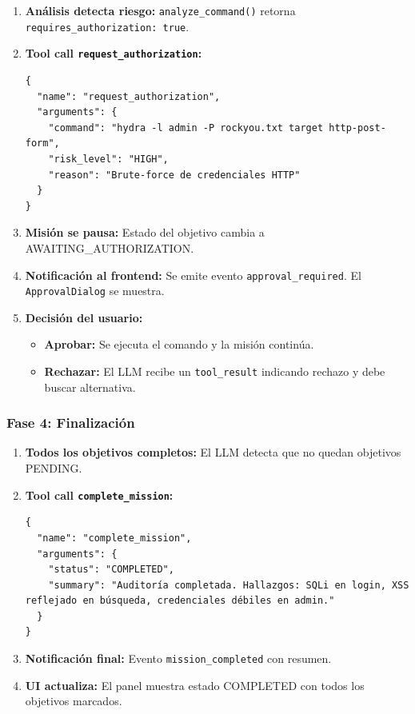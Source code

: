 \begin{enumerate}
    \item \textbf{Análisis detecta riesgo:} \texttt{analyze\_command()} retorna \texttt{requires\_authorization: true}.
    
    \item \textbf{Tool call \texttt{request\_authorization}:}
    \begin{verbatim}
{
  "name": "request_authorization",
  "arguments": {
    "command": "hydra -l admin -P rockyou.txt target http-post-form",
    "risk_level": "HIGH",
    "reason": "Brute-force de credenciales HTTP"
  }
}
    \end{verbatim}
    
    \item \textbf{Misión se pausa:} Estado del objetivo cambia a AWAITING\_AUTHORIZATION.
    
    \item \textbf{Notificación al frontend:} Se emite evento \texttt{approval\_required}. El \texttt{ApprovalDialog} se muestra.
    
    \item \textbf{Decisión del usuario:}
    \begin{itemize}
        \item \textbf{Aprobar:} Se ejecuta el comando y la misión continúa.
        \item \textbf{Rechazar:} El LLM recibe un \texttt{tool\_result} indicando rechazo y debe buscar alternativa.
    \end{itemize}
\end{enumerate}

\subsubsection{Fase 4: Finalización}

\begin{enumerate}
    \item \textbf{Todos los objetivos completos:} El LLM detecta que no quedan objetivos PENDING.
    
    \item \textbf{Tool call \texttt{complete\_mission}:}
    \begin{verbatim}
{
  "name": "complete_mission",
  "arguments": {
    "status": "COMPLETED",
    "summary": "Auditoría completada. Hallazgos: SQLi en login, XSS reflejado en búsqueda, credenciales débiles en admin."
  }
}
    \end{verbatim}
    
    \item \textbf{Notificación final:} Evento \texttt{mission\_completed} con resumen.
    
    \item \textbf{UI actualiza:} El panel muestra estado COMPLETED con todos los objetivos marcados.
\end{enumerate}


